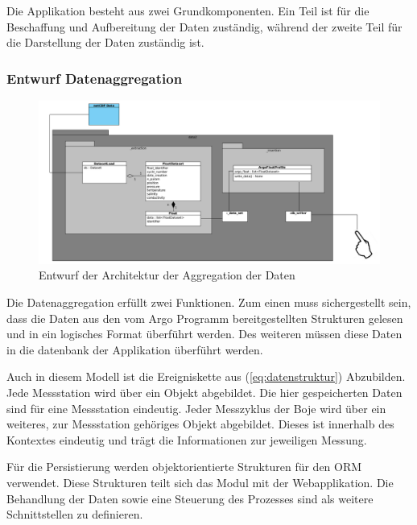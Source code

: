 

Die Applikation besteht aus zwei Grundkomponenten. Ein Teil ist für die Beschaffung und Aufbereitung der Daten zuständig, während der zweite Teil für die Darstellung der Daten zuständig ist. 

\subsubsection{Entwurf Datenaggregation}
\begin{figure}[h!]
\centering
\includegraphics[width=\textwidth]{pix/grobentwurf_dataaggregation.png}
\caption{Entwurf der Architektur der Aggregation der Daten}
\label{fig:grobetwurf_architektur_datenaggregation}
\end{figure}

Die Datenaggregation erfüllt zwei Funktionen. Zum einen muss sichergestellt sein, dass die Daten aus den vom Argo Programm bereitgestellten Strukturen gelesen und in ein logisches Format überführt werden. Des weiteren müssen diese Daten in die datenbank der Applikation überführt werden.

Auch in diesem Modell ist die Ereigniskette aus (\ref{eq:datenstruktur}) Abzubilden. Jede Messstation wird über ein Objekt abgebildet. Die hier gespeicherten Daten sind für eine Messstation eindeutig. Jeder Messzyklus der Boje wird über ein weiteres, zur Messstation gehöriges Objekt abgebildet. Dieses ist innerhalb des Kontextes eindeutig und trägt die Informationen zur jeweiligen Messung.

Für die Persistierung  werden objektorientierte Strukturen für den ORM verwendet. Diese Strukturen teilt sich das Modul mit der Webapplikation. Die Behandlung der Daten sowie eine Steuerung des Prozesses sind als weitere Schnittstellen zu definieren. 

